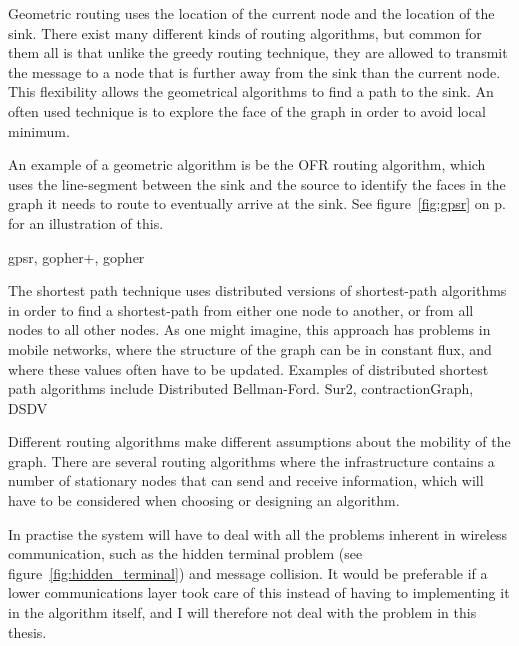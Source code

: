 \begin{description}
{Geometric routing uses the location of the current node and the location of the sink. There exist many different kinds of routing algorithms, but common for them all is that unlike the greedy routing technique, they are allowed to transmit the message to a node that is further away from the sink than the current node. This flexibility allows the geometrical algorithms to find a path to the sink. An often used technique is to explore the face of the graph in order to avoid local minimum.

An example of a geometric algorithm is be the OFR \cite{gopher} routing algorithm, which uses the line-segment between the sink and the source to identify the faces in the graph it needs to route to eventually arrive at the sink. See figure~\ref{fig:gpsr} on p. \pageref{fig:gpsr} for an illustration of this.}
{gpsr, gopher+, gopher}

      {The shortest path technique uses distributed versions of shortest-path algorithms in order to find a shortest-path from either one node to another, or from all nodes to all other nodes. As one might imagine, this approach has problems in mobile networks, where the structure of the graph can be in constant flux, and where these values often have to be updated. Examples of distributed shortest path algorithms include Distributed Bellman-Ford.}
{Sur2, contractionGraph, DSDV}
\end{description}

Different routing algorithms make different assumptions about the mobility of the graph. There are several routing algorithms \cite{adaptive, two-tier} where the infrastructure contains a number of stationary nodes that can send and receive information, which will have to be considered when choosing or designing an algorithm.


In practise the system will have to deal with all the problems inherent in wireless communication, such as the hidden terminal problem (see figure~\ref{fig:hidden_terminal}) and message collision. It would be preferable if a lower communications layer took care of this instead of having to implementing it in the algorithm itself, and I will therefore not deal with the problem in this thesis.

